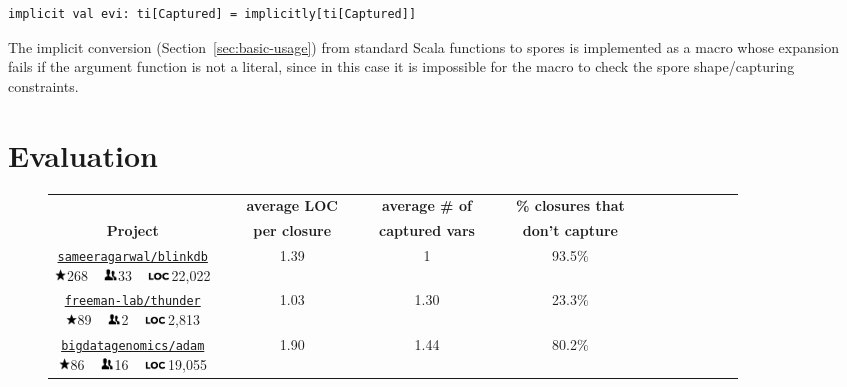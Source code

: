 \documentclass[runningheads]{llncs}
\newcommand{\myrowcolour}{\rowcolor[gray]{0.925}}
\newcommand*\loc{\includegraphics[height=0.65em,keepaspectratio]{loc}}
\newcommand*\stars{\includegraphics[height=0.8em,keepaspectratio]{stars}}
\newcommand*\contribs{\includegraphics[height=0.8em,keepaspectratio]{contribs}}
\begin{document}
\begin{sloppypar}
\begin{lstlisting}[numbers=none]
    implicit val evi: ti[Captured] = implicitly[ti[Captured]]
\end{lstlisting}
\noindent
The implicit conversion (Section~\ref{sec:basic-usage}) from standard Scala functions to spores is implemented as a macro whose expansion fails if the argument function is not a literal, since in this case it is impossible for the macro to check the spore shape/capturing constraints.



\section{Evaluation}
\label{sec:evaluation}


\begin{figure}
\begin{longtable}{c@{}c c@{}c c@{}c c@{}c c@{}c c@{}c c@{}c }
\toprule%

{\bfseries } && {\bfseries ~average LOC~} && {\bfseries ~average \# of~} && {\bfseries ~\% closures that~} \\
{\bfseries Project} && {\bfseries per closure} && {\bfseries captured vars} && {\bfseries don't capture} \\

\cmidrule(l){0-1} \cmidrule(l){2-3} \cmidrule(l){4-5} \cmidrule(l){6-7}



\parbox[c][0.8cm]{4cm}{\centering\normalsize\href{https://github.com/sameeragarwal/blinkdb}{\texttt{sameeragarwal/blinkdb}}\\ \stars 268 ~ \contribs 33 ~ \loc 22,022} && 1.39 && 1 && 93.5\% \\

\myrowcolour%
\parbox[c][0.8cm]{4cm}{\centering\normalsize\href{https://github.com/freeman-lab/thunder}{\texttt{freeman-lab/thunder}}\\ \stars 89 ~ \contribs 2 ~ \loc 2,813} && 1.03 && 1.30 && 23.3\% \\

\parbox[c][0.8cm]{4cm}{\centering\normalsize\href{https://github.com/bigdatagenomics/adam}{\texttt{bigdatagenomics/adam}}\\ \stars 86 ~ \contribs 16 ~ \loc 19,055} && 1.90 && 1.44 && 80.2\% \\


\end{longtable}
\end{figure}
\end{sloppypar}
\end{document}
